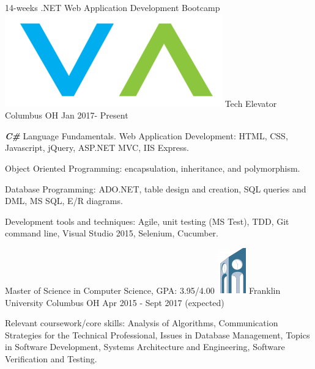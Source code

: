 \begin{cventries}
 \vspace{-2mm} \cventry
    {14-weeks .NET Web Application Development Bootcamp}
    {\includegraphics[scale=0.20]{img/download.png} Tech Elevator}
    {Columbus OH}
    {Jan 2017- Present}
    {
      \begin{cvitems}     
        \item {\textbf{\textit{C\#}} Language Fundamentals. Web Application Development: HTML, CSS, Javascript, jQuery, ASP.NET MVC, IIS Express.}
        \item {Object Oriented Programming: encapsulation, inheritance, and polymorphism.}
         \item {Database Programming: ADO.NET, table design and creation, SQL queries and DML, MS SQL, E/R diagrams.}
         \item {Development tools and techniques: Agile, unit testing (MS Test), TDD, Git command line, Visual Studio 2015, Selenium, Cucumber.}
      \end{cvitems}\vspace{-3mm}
    }
    \vspace{-2mm} \cventry
    {Master of Science in Computer Science, GPA: 3.95/4.00}
    {\includegraphics[scale=0.33]{img/franklinuniversity-190x75.png} Franklin University}
    {Columbus OH}
    {Apr 2015 - Sept 2017 (expected)}
    {
      \begin{cvitems}     
        \item {Relevant coursework/core skills: Analysis of Algorithms, Communication Strategies for the Technical Professional, Issues in Database Management, Topics in Software Development, Systems Architecture and Engineering, Software Verification and Testing.}\vspace{-2mm}     
      \end{cvitems}
}
\end{cventries}
